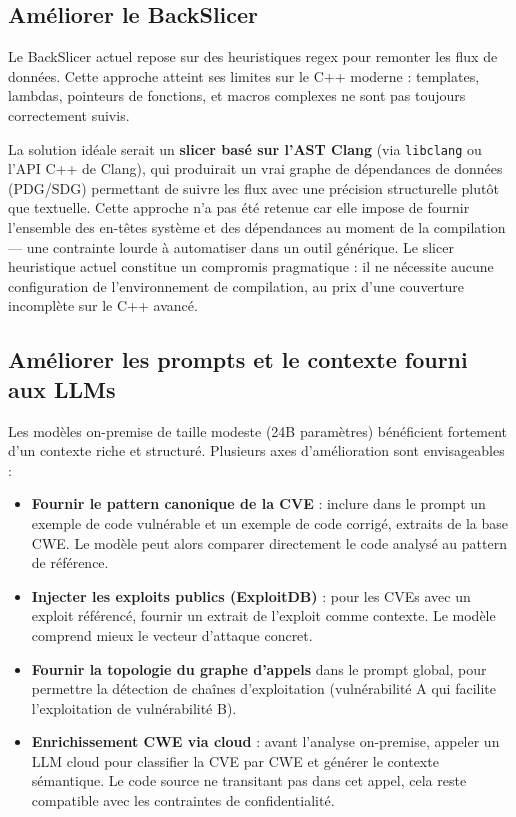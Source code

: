 \documentclass[a4paper, 12pt, hidelinks]{article}
\begin{document}
\subsection*{Améliorer le BackSlicer}

Le BackSlicer actuel repose sur des heuristiques regex pour remonter les flux de données. Cette approche atteint ses limites sur le C++ moderne : templates, lambdas, pointeurs de fonctions, et macros complexes ne sont pas toujours correctement suivis.

La solution idéale serait un \textbf{slicer basé sur l'AST Clang} (via \texttt{libclang} ou l'API C++ de Clang), qui produirait un vrai graphe de dépendances de données (PDG/SDG) permettant de suivre les flux avec une précision structurelle plutôt que textuelle. Cette approche n'a pas été retenue car elle impose de fournir l'ensemble des en-têtes système et des dépendances au moment de la compilation --- une contrainte lourde à automatiser dans un outil générique. Le slicer heuristique actuel constitue un compromis pragmatique : il ne nécessite aucune configuration de l'environnement de compilation, au prix d'une couverture incomplète sur le C++ avancé.

\subsection*{Améliorer les prompts et le contexte fourni aux LLMs}

Les modèles on-premise de taille modeste (24B paramètres) bénéficient fortement d'un contexte riche et structuré. Plusieurs axes d'amélioration sont envisageables :

\begin{itemize}
  \item \textbf{Fournir le pattern canonique de la CVE} : inclure dans le prompt un exemple de code vulnérable et un exemple de code corrigé, extraits de la base CWE. Le modèle peut alors comparer directement le code analysé au pattern de référence.
  \item \textbf{Injecter les exploits publics (ExploitDB)} : pour les CVEs avec un exploit référencé, fournir un extrait de l'exploit comme contexte. Le modèle comprend mieux le vecteur d'attaque concret.
  \item \textbf{Fournir la topologie du graphe d'appels} dans le prompt global, pour permettre la détection de chaînes d'exploitation (vulnérabilité A qui facilite l'exploitation de vulnérabilité B).
  \item \textbf{Enrichissement CWE via cloud} : avant l'analyse on-premise, appeler un LLM cloud pour classifier la CVE par CWE et générer le contexte sémantique. Le code source ne transitant pas dans cet appel, cela reste compatible avec les contraintes de confidentialité.
\end{itemize}
\end{document}
